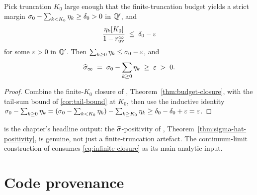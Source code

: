 \begin{theorem}
\label{thm:infinite-budget}
Pick truncation $K_0$ large enough that the finite-truncation
budget yields a strict margin
$\sigma_0 - \sum_{k < K_0} \eta_k \ge \delta_0 > 0$ in $\mathbb{Q}'$, and
\begin{equation}
  \label{eq:tail-margin}
  \frac{\eta_k[K_0]}{1 - r_{\mathrm{uv}}^\infty} \;\le\; \delta_0 - \varepsilon
\end{equation}
for some $\varepsilon > 0$ in $\mathbb{Q}'$.  Then $\sum_{k \ge 0} \eta_k \le
\sigma_0 - \varepsilon$, and
\begin{equation}
  \label{eq:infinite-closure}
  \widehat{\sigma}_\infty \;=\; \sigma_0 - \sum_{k \ge 0} \eta_k \;\ge\; \varepsilon \;>\; 0 .
\end{equation}
\end{theorem}

\begin{proof}
Combine the finite-$K_0$ closure of
,
Theorem~\ref{thm:budget-closure}, with the tail-sum bound of
\cref{cor:tail-bound} at $K_0$, then use the inductive identity
$\sigma_0 - \sum_{k \ge 0} \eta_k = (\sigma_0 - \sum_{k < K_0}
\eta_k) - \sum_{k \ge K_0} \eta_k \ge \delta_0 - \delta_0 +
\varepsilon = \varepsilon$.
\end{proof}

 is the chapter's headline output: the
$\widehat{\sigma}$-positivity of ,
Theorem~\ref{thm:sigma-hat-positivity}, is genuine, not just a
finite-truncation artefact.  The continuum-limit construction of
 consumes \eqref{eq:infinite-closure} as
its main analytic input.

\section{Code provenance}
\label{sec:uv-codeanchor}

